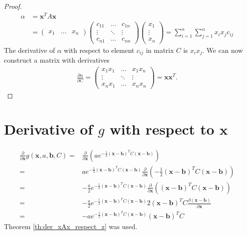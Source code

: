 \documentclass{paper}
\newcommand{\vr}[1]{\ensuremath{\boldsymbol{#1}}}
\newcommand{\mx}[1]{\ensuremath{#1}}
\begin{document}
\begin{proof}
	\begin{align}
		\alpha &= \vr{x}^T \mx{A} \vr{x} \\
		&=
		\begin{pmatrix}
			x_1 & \ldots & x_n
		\end{pmatrix}
		\begin{pmatrix}
			c_{11} & \ldots & c_{1n} \\
			\vdots & \ddots & \vdots \\
			c_{n1} & \ldots & c_{nn}
		\end{pmatrix}
		\begin{pmatrix}
			x_1 \\
			\vdots \\
			x_n
		\end{pmatrix} = \sum_{i=1}^{n} \sum_{j=1}^{n} x_i x_j c_{ij}
	\end{align}
	The derivative of $\alpha$ with respect to element $c_{ij}$ in matrix $\mx{C}$ is $x_i x_j$.
	We can now construct a matrix with derivatives
	\begin{align}
		\frac{\partial \alpha}{\partial \mx{C}} =
		\begin{pmatrix}
			x_{1}x_{1} & \ldots & x_{1}x_{n} \\
			\vdots & \ddots & \vdots \\
			x_{n}x_{1} & \ldots & x_{n}x_{n}
		\end{pmatrix} = \vr{x} \vr{x}^T.
	\end{align}
\end{proof}

\section{Derivative of $g$ with respect to $\vr{x}$}
\begin{align}
	\frac{\partial}{\partial \vr{x}} g(\vr{x}, a, \vr{b}, C) =& \frac{\partial}{\partial \vr{x}} \left(a e^{-\frac{1}{2}(\vr{x}-\vr{b})^T C(\vr{x}-\vr{b})} \right) \nonumber \\
	=& a e^{-\frac{1}{2}(\vr{x}-\vr{b})^TC(\vr{x}-\vr{b})} \frac{\partial}{\partial \vr{x}} \left(-\frac{1}{2}(\vr{x}-\vr{b})^T C(\vr{x}-\vr{b})\right) \nonumber \\
	=& -\frac{a}{2} e^{-\frac{1}{2}(\vr{x}-\vr{b})^TC(\vr{x}-\vr{b})} \frac{\partial}{\partial \vr{x}} \left((\vr{x}-\vr{b})^T C(\vr{x}-\vr{b})\right) \nonumber \\
	=& -\frac{a}{2} e^{-\frac{1}{2}(\vr{x}-\vr{b})^TC(\vr{x}-\vr{b})} 2 (\vr{x}-\vr{b})^T C \frac{\partial (\vr{x}-\vr{b})}{\partial \vr{x}} \nonumber \\
	=& -a e^{-\frac{1}{2}(\vr{x}-\vr{b})^TC(\vr{x}-\vr{b})} (\vr{x}-\vr{b})^T C
\end{align}
Theorem \ref{th:der_xAx_respect_z} was used.
\end{document}
